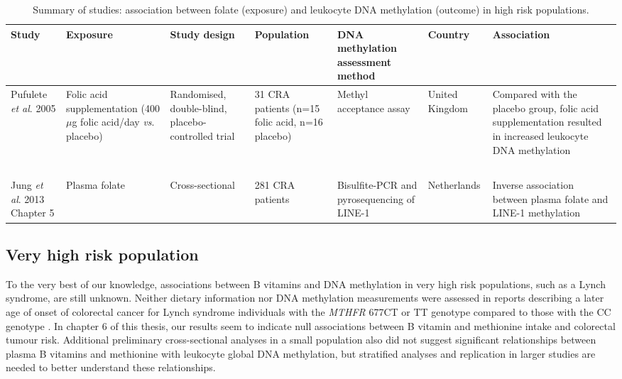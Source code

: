 \vspace{0pt}
\begin{sidewaystable}
\normalsize
\caption{Summary of studies: association between folate (exposure) and leukocyte DNA methylation (outcome) in high risk populations.} 
\label{table7_6}
\renewcommand{\arraystretch}{1}
\begin{tabular}{L{2cm}C{2cm}C{2cm}C{2cm}C{2.5cm}C{1.5cm}C{3cm}} 
\hline\bfseries Study & \bfseries Exposure & \bfseries Study design & \bfseries Population & \bfseries DNA methylation assessment 
method & \bfseries Country & \bfseries Association\\

\hline Pufulete \textit{et al}. 2005 \cite{c713} & Folic acid supplementation (400 
$\mu$g folic acid/day \textit{vs}. placebo) & Randomised, double-blind, 
placebo-controlled trial & 31 CRA patients (n=15 folic acid, n=16 
placebo) & Methyl acceptance assay & United Kingdom & Compared with the placebo group, folic 
acid supplementation resulted in increased leukocyte DNA 
methylation\\

~ & ~ & ~ & ~ & ~ & ~ & ~\\

{ {Jung 
}{\textit{et al}}{. 2013 
}\cite{c714}} 
Chapter 5 & Plasma folate & Cross-sectional & 281 CRA patients & Bisulfite-PCR and pyrosequencing of 
LINE-1 & Netherlands & Inverse association between plasma 
folate and LINE-1 methylation\\
\hline
\end{tabular}
\end{sidewaystable} 

\subsection{Very high risk population} %
\noindent To the very best of our knowledge, associations between B vitamins and DNA methylation in very high risk populations, such as a Lynch syndrome, are still unknown. Neither dietary information nor DNA methylation measurements were assessed in reports describing a later age of onset of colorectal cancer for Lynch syndrome individuals with the \emph{MTHFR} 677CT or TT genotype compared to those with the CC genotype \cite{c715,c716}. In chapter 6 of this thesis, our results seem to indicate null associations between B vitamin and methionine intake and colorectal tumour risk. Additional preliminary cross-sectional analyses in a small population also did not suggest significant relationships between plasma B vitamins and methionine with leukocyte global DNA methylation, but stratified analyses and replication in larger studies are needed to better understand these relationships. 
 
